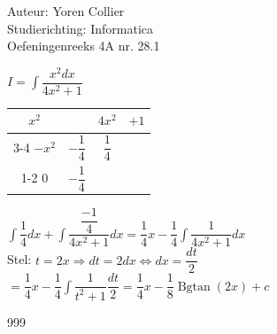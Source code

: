 \documentclass[a4paper]{article}
\newcommand{\asa}{\Leftrightarrow} %
\newcommand{\adR}{\Rightarrow} %
\newcommand{\Lh}{\left(} %
\newcommand{\Rh}{\right)}
\newcommand{\intgrl}{\displaystyle\int} %
\begin{document}
\noindent \large Auteur: Yoren Collier \\
\noindent \large Studierichting: Informatica\\
\noindent \large Oefeningenreeks 4A nr. 28.1\\

\medskip

\normalsize

$ I =  \intgrl \dfrac{x^2 dx}{4x^2 +1}$\\

\begin{tabular}{cc|cc}
  $x^2$  &                   &  $4x^2$          &  $+1$  \\ \cline{3-4}
  $-x^2$  &  $-\dfrac{1}{4}$   &  $\dfrac{1}{4}$  &  \\ \cline{1-2}
  $0$    &  $-\dfrac{1}{4}$  &                  &     
\end{tabular}

$\intgrl \dfrac{1}{4} dx + \intgrl \dfrac{\dfrac{-1}{4}}{4x^2 +1} dx = \dfrac{1}{4}x - \dfrac{1}{4} \intgrl \dfrac{1}{4x^2 +1} dx$\\

Stel: $t = 2x \adR dt = 2dx \asa dx = \dfrac{dt}{2} $\\

$= \dfrac{1}{4}x - \dfrac{1}{4} \intgrl \dfrac{1}{t^2 +1} \dfrac{dt}{2} = \dfrac{1}{4}x - \dfrac{1}{8} \operatorname{Bgtan} \Lh 2x \Rh +c$\\

\begin{thebibliography}{999}
\end{thebibliography}
\end{document}
